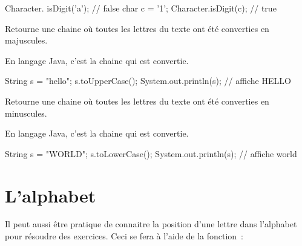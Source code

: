 \begin{description}
		\begin{java}
Character. isDigit('a');  // false
char c = '1';
Character.isDigit(c);   // true			
		\end{java}
	
	\item[\pc{toUpperCase(s: string)\Gives~string}]
		Retourne une chaine où toutes les lettres du texte
		ont été converties en majuscules.

		En langage Java, c'est la chaine qui est convertie. \\

		\begin{java}
String s = "hello";
s.toUpperCase();
System.out.println(s);		// affiche HELLO
		\end{java}

	\item[\pc{toLowerCase(s: string)\Gives~string}]
		Retourne une chaine où toutes les lettres du texte
		ont été converties en minuscules.
		
		En langage Java, c'est la chaine qui est convertie. \\

		\begin{java}
String s = "WORLD";
s.toLowerCase();
System.out.println(s);		// affiche world
		\end{java}
	
	\end{description}
	

\section{L’alphabet}

	Il peut aussi être pratique de connaitre la position d’une lettre dans
	l’alphabet pour résoudre des exercices.  Ceci se fera à l’aide de la
	fonction~:

